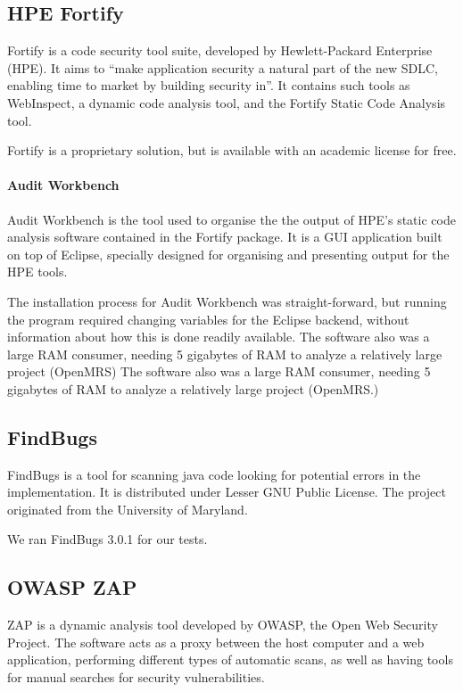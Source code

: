 \documentclass{article}
\begin{document}
\subsection{HPE Fortify}

  Fortify is a code security tool suite, developed by Hewlett-Packard
  Enterprise (HPE). It aims to ``make application security a natural part of the new
  SDLC, enabling time to market by building security in''\autocite[]{Fortify}.
  It contains such tools as WebInspect, a dynamic code analysis tool, and the
  Fortify Static Code Analysis tool.

  Fortify is a proprietary solution, but is available with an academic license
  for free.

\paragraph{Audit Workbench}

  Audit Workbench is the tool used to organise the the output of HPE's static
  code analysis software contained in the Fortify package. It is a GUI
  application built on top of Eclipse, specially designed for organising and
  presenting output for the HPE tools. 
  
  The installation process for Audit Workbench was straight-forward, but running
  the program required changing variables for the Eclipse backend, without
  information about how this is done readily available. The software also was a
  large RAM consumer, needing 5 gigabytes of RAM to analyze a relatively large
  project (OpenMRS) The software also was a large RAM consumer, needing 5
  gigabytes of RAM to analyze a relatively large project (OpenMRS.)

\subsection{FindBugs}

FindBugs is a tool for scanning java code looking for potential errors in the
implementation. It is distributed under Lesser GNU Public License. The project
originated from the University of Maryland.\autocite[]{FindBugs}

We ran FindBugs 3.0.1 for our tests.
 

\subsection{OWASP ZAP}

ZAP is a dynamic analysis tool developed by OWASP, the Open Web Security
Project. The software acts as a proxy between the host computer and a web
application, performing different types of automatic scans, as well as having
tools for manual searches for security vulnerabilities\autocite[]{ZAP}.
\end{document}
